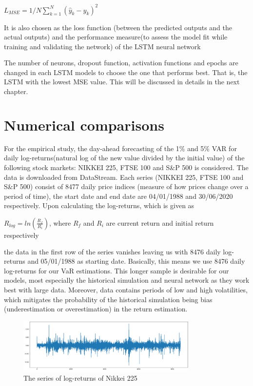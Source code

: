 \documentclass[a4paper,11pt,oneside]{book}
\begin{document}
\begin{itemize}
\begin{center}
	$L_{MSE} = 1/N\sum_{k=1}^{N} ({\hat{y}}_{k}-y_k)^2$
\end{center}
It is also chosen as the loss function (between the predicted outputs and the actual outputs) and the performance measure(to assess the model fit while
training and validating the network) of the
LSTM neural network
\end{itemize}

The number of neurons, dropout function, activation functions and epochs are changed in each LSTM models to choose the one that performs best. That is, the LSTM with the lowest MSE value. This will be discussed in details in the next chapter.


\chapter{Numerical comparisons}
For the empirical study, the day-ahead forecasting of the 1\% and 5\% VAR for daily log-returns(natural log of the new value divided by the initial value) of the following stock markets: NIKKEI 225, FTSE 100 and S\&P 500 is considered. The data is downloaded from DataStream. Each series (NIKKEI 225, FTSE 100 and S\&P 500) consist of 8477 daily price indices (measure of how prices change over a period of time), the start date and end date are 04/01/1988 and 30/06/2020 respectively. Upon calculating the log-returns, which is given as 

\begin{center}
	$R_{log} = ln(\frac{R_f}{R_i})$, where ${R_f}$ and ${R_i}$ are current return and initial return respectively
\end{center}
the data in the first row of the series vanishes leaving us with 8476 daily log-returns and 05/01/1988 as starting date. Basically, this means we use 8476 daily log-returns for our VaR estimations. This longer sample is desirable for our models, most especially the historical simulation and neural network as they work best with large data. Moreover, data contains periods of low and high volatilities, which mitigates the probability of the historical simulation being bias (underestimation or overestimation) in the return estimation.\newline

\begin{figure}[!h]
	\centering
	\includegraphics[width=0.8\textwidth]{figures/logNikkei}
	\caption{The series of log-returns of Nikkei 225}
	\label{logNikkei}
\end{figure}
\end{document}
